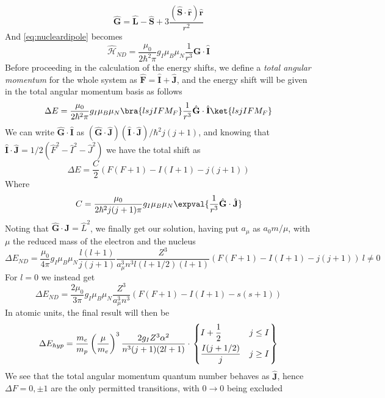 \documentclass[a4paper, 11pt]{book}
\renewcommand{\vec}[1]{\mathbf{#1}}
\newcommand{\1}{\opr{\mathds{1}}}
\newcommand{\ham}{\mathcal{H}}
\newcommand{\opr}[1]{\hat{#1}}
\newcommand{\vecopr}[1]{\opr{\vec{#1}}}
\theoremstyle{plain}
\begin{document}
	\begin{equation}
		\vecopr{G}=\vecopr{L}-\vecopr{S}+3\frac{(\vecopr{S}\cdot\vecopr{r})\vecopr{r}}{r^2}
		\label{eq:gangularmomnuc}
	\end{equation}
	And \eqref{eq:nucleardipole} becomes
	\begin{equation}
		\opr{\ham}_{ND}=\frac{\mu_0}{2\hbar^2\pi}g_I\mu_B\mu_N\frac{1}{r^3}\vecopr{G}\cdot\vecopr{I}
		\label{eq:nucleardipoleG}
	\end{equation}
	Before proceeding in the calculation of the energy shifts, we define a \textit{total angular momentum} for the whole system as $\vecopr{F}=\vecopr{I}+\vecopr{J}$, and the energy shift will be given in the total angular momentum basis as follows
	\begin{equation}
		\Delta E=\frac{\mu_0}{2\hbar^2\pi}g_I\mu_B\mu_N\bra{lsjIFM_F}\frac{1}{r^3}\vecopr{G}\cdot\vecopr{I}\ket{lsjIFM_F}
		\label{eq:energyshiftnucmom}
	\end{equation}
	We can write $\vecopr{G}\cdot\vecopr{I}$ as $(\vecopr{G}\cdot\vecopr{J})(\vecopr{I}\cdot\vecopr{J})/\hbar^2j(j+1)$, and knowing that $\vecopr{I}\cdot\vecopr{J}=1/2\left( \opr{F}^2-\opr{I}^2-\opr{J}^2 \right)$ we have the total shift as
	\begin{equation}
		\Delta E=\frac{C}{2}\left( F(F+1)-I(I+1)-j(j+1) \right)
		\label{eq:totalenergyshiftmnd}
	\end{equation}
	Where
	\begin{equation}
		C=\frac{\mu_0}{2\hbar^2j(j+1)\pi}g_I\mu_B\mu_N\expval{\frac{1}{r^3}\vecopr{G}\cdot\vecopr{J}}
		\label{eq:constantmdshift}
	\end{equation}
	Noting that $\vecopr{G}\cdot\vecopr{J}=\opr{L}^2$, we finally get our solution, having put $a_{\mu}$ as $a_0m/\mu$, with $\mu$ the reduced mass of the electron and the nucleus
	\begin{equation}
		\Delta E_{ND}=\frac{\mu_0}{4\pi}g_I\mu_B\mu_N\frac{l(l+1)}{j(j+1)}\frac{Z^3}{a_{\mu}^3n^3l(l+1/2)(l+1)}\left( F(F+1)-I(I+1)-j(j+1) \right)\ l\ne0
		\label{eq:finalsolenuclearmom}
	\end{equation}
	For $l=0$ we instead get
	\begin{equation}
		\Delta E_{ND}=\frac{2\mu_0}{3\pi}g_I\mu_B\mu_N\frac{Z^3}{a_{\mu}^3n^3}\left( F(F+1)-I(I+1)-s(s+1) \right)
		\label{eq:l0nuclearmom}
	\end{equation}
	In atomic units, the final result will then be
	\begin{equation}
		\Delta E_{hyp}=\frac{m_e}{m_p}\left( \frac{\mu}{m_e} \right)^3\frac{2g_IZ^3\alpha^2}{n^3(j+1)(2l+1)}\cdot\left.\begin{dcases}I+\frac{1}{2}&j\le I\\
		\frac{I(j+1/2)}{j}&j\ge I\end{dcases}\right\}
		\label{eq:hyperfinetrans}
	\end{equation}
	We see that the total angular momentum quantum number behaves as $\vecopr{J}$, hence $\Delta F=0,\pm1$ are the only permitted transitions, with $0\to0$ being excluded
\end{document}
